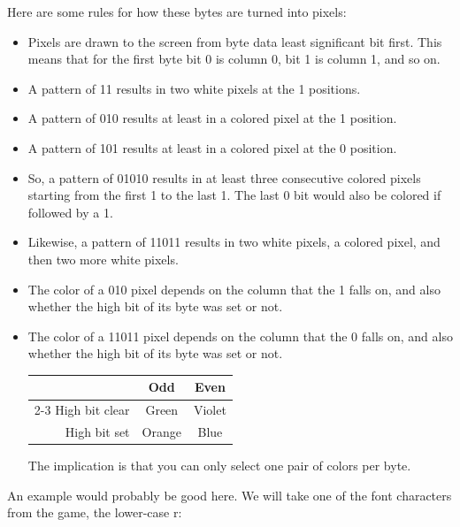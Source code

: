 \documentclass[10pt]{report}
\begin{document}
Here are some rules for how these bytes are turned into pixels:
\begin{itemize}
  \item Pixels are drawn to the screen from byte data least significant bit first.
        This means that for the first byte bit 0 is column 0, bit 1 is column 1,
        and so on.
  \item A pattern of {\Tt{}11\nwendquote} results in two white pixels at the {\Tt{}1\nwendquote} positions.
  \item A pattern of {\Tt{}010\nwendquote} results at least in a colored pixel at the {\Tt{}1\nwendquote} position.
  \item A pattern of {\Tt{}101\nwendquote} results at least in a colored pixel at the {\Tt{}0\nwendquote} position.
  \item So, a pattern of {\Tt{}01010\nwendquote} results in at least three consecutive colored
        pixels starting from the first {\Tt{}1\nwendquote} to the last {\Tt{}1\nwendquote}. The last {\Tt{}0\nwendquote} bit
        would also be colored if followed by a {\Tt{}1\nwendquote}.
  \item Likewise, a pattern of {\Tt{}11011\nwendquote} results in two white pixels, a colored pixel,
        and then two more white pixels.
  \item The color of a {\Tt{}010\nwendquote} pixel depends on the column that the {\Tt{}1\nwendquote} falls on, and
        also whether the high bit of its byte was set or not.
  \item The color of a {\Tt{}11011\nwendquote} pixel depends on the column that the {\Tt{}0\nwendquote} falls on, and
        also whether the high bit of its byte was set or not.

        \begin{center}
        \begin{tabular}{@{}rcc@{}} \toprule
        & Odd & Even \\ \cmidrule(r){2-3}
        High bit clear & Green & Violet \\
        High bit set & Orange & Blue \\ \bottomrule
        \end{tabular}
        \end{center}

        The implication is that you can only select one pair of colors per byte.
\end{itemize}

An example would probably be good here. We will take one of the font characters from the game,
the lower-case {\Tt{}r\nwendquote}:
\end{document}
